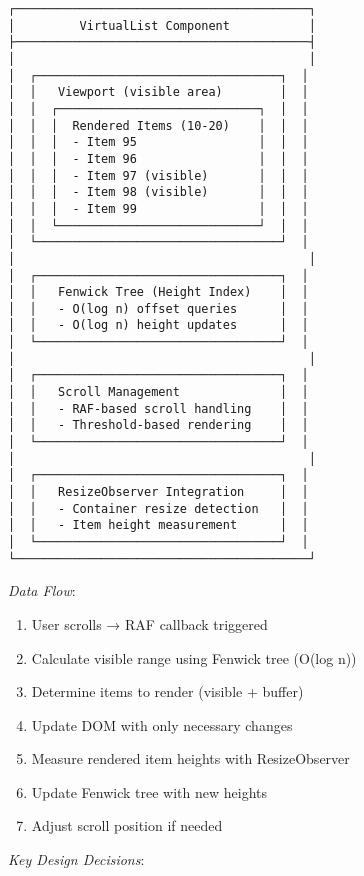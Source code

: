 \documentclass[11pt]{article}
\begin{document}
\begin{verbatim}
┌─────────────────────────────────────────┐
│         VirtualList Component           │
├─────────────────────────────────────────┤
│                                         │
│  ┌──────────────────────────────────┐  │
│  │   Viewport (visible area)        │  │
│  │  ┌────────────────────────────┐  │  │
│  │  │  Rendered Items (10-20)    │  │  │
│  │  │  - Item 95                 │  │  │
│  │  │  - Item 96                 │  │  │
│  │  │  - Item 97 (visible)       │  │  │
│  │  │  - Item 98 (visible)       │  │  │
│  │  │  - Item 99                 │  │  │
│  │  └────────────────────────────┘  │  │
│  └──────────────────────────────────┘  │
│                                         │
│  ┌──────────────────────────────────┐  │
│  │   Fenwick Tree (Height Index)    │  │
│  │   - O(log n) offset queries      │  │
│  │   - O(log n) height updates      │  │
│  └──────────────────────────────────┘  │
│                                         │
│  ┌──────────────────────────────────┐  │
│  │   Scroll Management              │  │
│  │   - RAF-based scroll handling    │  │
│  │   - Threshold-based rendering    │  │
│  └──────────────────────────────────┘  │
│                                         │
│  ┌──────────────────────────────────┐  │
│  │   ResizeObserver Integration     │  │
│  │   - Container resize detection   │  │
│  │   - Item height measurement      │  │
│  └──────────────────────────────────┘  │
└─────────────────────────────────────────┘
\end{verbatim}

\emph{Data Flow}:
\begin{enumerate}
\item User scrolls → RAF callback triggered
\item Calculate visible range using Fenwick tree (O(log n))
\item Determine items to render (visible + buffer)
\item Update DOM with only necessary changes
\item Measure rendered item heights with ResizeObserver
\item Update Fenwick tree with new heights
\item Adjust scroll position if needed
\end{enumerate}

\emph{Key Design Decisions}:
\end{document}
